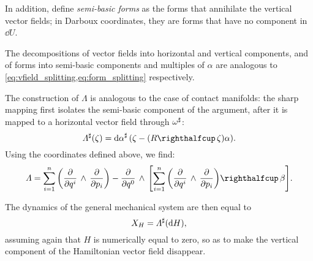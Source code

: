 In addition, define \emph{semi-basic forms} as the forms that annihilate the vertical vector fields; in Darboux coordinates, they are forms that have no component in \(\dd{U}\).

The decompositions of vector fields into horizontal and vertical components, and of forms into semi-basic components and multiples of \(\alpha\) are analogous to \cref{eq:vfield_splitting,eq:form_splitting} respectively.

The construction of \(\Lambda\) is analogous to the case of contact manifolds: the sharp mapping first isolates the semi-basic component of the argument, after it is mapped to a horizontal vector field through \(\omega^\sharp\):
\begin{equation}
     \fromDual{\Lambda}(\zeta) = \fromDual{\dd{\alpha}}\qty(\zeta - (\intpr{R}{\zeta})\alpha).
\end{equation}
Using the coordinates defined above, we find:
\begin{equation}
    \Lambda = \sum_{i=1}^n \qty(\wedgep{\pdv{}{q^i}}{\pdv{}{p_i}}) - \wedgep{\pdv{}{q^0}}{\qty[\intpr{\sum_{i=1}^n \qty(\wedgep{\pdv{}{q^i}}{\pdv{}{p_i}})}{\beta}]}.
    \label{eq:general_bivector}
\end{equation}

The dynamics of the general mechanical system are then equal to 
\begin{equation} 
    X_H = \Lambda^\sharp(\dd{H}), 
    \label{eq:general_isomorphism}
\end{equation}
assuming again that \(H\) is numerically equal to zero, so as to make the vertical component of the Hamiltonian vector field disappear. 

